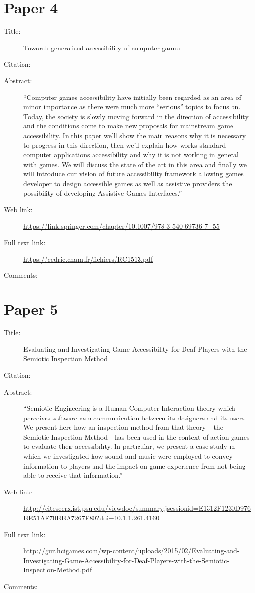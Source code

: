 \documentclass{scrartcl}
\begin{document}
\section*{Paper 4} 
\begin{description} 
\item[Title:] Towards generalised accessibility of computer games 
\item[Citation:] \cite{Arch} 
\item[Abstract:] ``Computer games accessibility have initially been regarded as an area of minor importance as there were much more “serious” topics to focus on. Today, the society is slowly moving forward in the direction of accessibility and the conditions come to make new proposals for mainstream game accessibility. In this paper we’ll show the main reasons why it is necessary to progress in this direction, then we’ll explain how works standard computer applications accessibility and why it is not working in general with games. We will discuss the state of the art in this area and finally we will introduce our vision of future accessibility framework allowing games developer to design accessible games as well as assistive providers the possibility of developing Assistive Games Interfaces.'' \item[Web link:] \url {https://link.springer.com/chapter/10.1007/978-3-540-69736-7_55} 
\item[Full text link:] \url {https://cedric.cnam.fr/fichiers/RC1513.pdf} 
\item[Comments:] 
\end{description}

\section*{Paper 5}
\begin{description}
\item[Title:] Evaluating and Investigating Game Accessibility for Deaf Players with the Semiotic Inspection Method
\item[Citation:] \cite{Flav}
\item[Abstract:] ``Semiotic Engineering is a Human Computer Interaction theory which perceives software as a communication between its designers and its users. We present here how an inspection method from that theory – the Semiotic Inspection Method - has been used in the context of action games to evaluate their accessibility. In particular, we present a case study in which we investigated how sound and music were employed to convey information to players and the impact on game experience from not being able to receive that information.''
\item[Web link:] \url {http://citeseerx.ist.psu.edu/viewdoc/summary;jsessionid=E1312F1230D976BE51AF70BBA7267F80?doi=10.1.1.261.4160}
\item[Full text link:] \url {http://gur.hcigames.com/wp-content/uploads/2015/02/Evaluating-and-Investigating-Game-Accessibility-for-Deaf-Players-with-the-Semiotic-Inspection-Method.pdf}
\item[Comments:]
\end{description}
\end{document}

